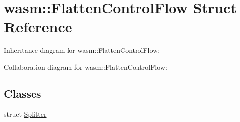 \hypertarget{structwasm_1_1_flatten_control_flow}{}\section{wasm\+:\+:Flatten\+Control\+Flow Struct Reference}
\label{structwasm_1_1_flatten_control_flow}


Inheritance diagram for wasm\+:\+:Flatten\+Control\+Flow\+:


Collaboration diagram for wasm\+:\+:Flatten\+Control\+Flow\+:
\subsection*{Classes}
\begin{DoxyCompactItemize}
\item 
struct \mbox{\hyperlink{structwasm_1_1_flatten_control_flow_1_1_splitter}{Splitter}}
\end{DoxyCompactItemize}
